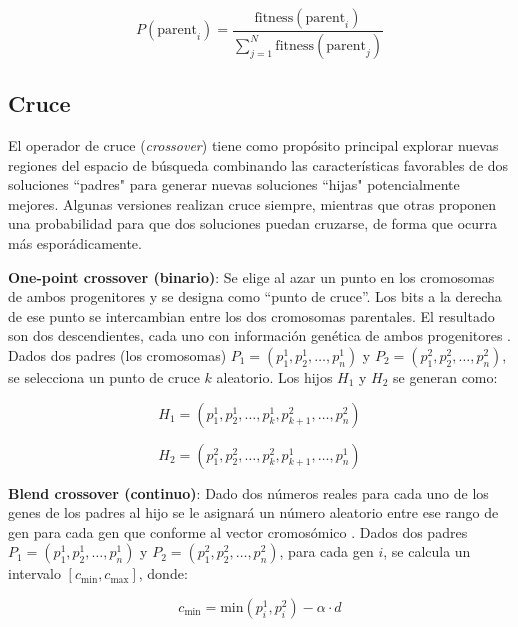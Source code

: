 \documentclass[12pt,letterpaper]{article}
\begin{document}
\begin{equation}
    P(\text{parent}_i) = \frac{\text{fitness}(\text{parent}_i)}{\sum_{j=1}^N \text{fitness}(\text{parent}_j)}
    \label{eq:tournament}
\end{equation}

\subsection{Cruce}
El operador de cruce (\textit{crossover}) tiene como propósito principal explorar nuevas regiones del espacio de búsqueda combinando las características favorables de dos soluciones ``padres" para generar nuevas soluciones ``hijas" potencialmente mejores. Algunas versiones realizan cruce siempre, mientras que otras proponen una probabilidad para que dos soluciones puedan cruzarse, de forma que ocurra más esporádicamente.

\textbf{One-point crossover (binario)}: Se elige al azar un punto en los cromosomas de
ambos progenitores y se designa como ``punto de cruce”. Los bits a la
derecha de ese punto se intercambian entre los dos cromosomas parentales.
El resultado son dos descendientes, cada uno con información genética de
ambos progenitores \cite{DAGDIA2020283}.
Dados dos padres (los cromosomas) \( P_1 = (p_1^1, p_2^1, \dots, p_n^1) \) y \( P_2 = (p_1^2, p_2^2, \dots, p_n^2) \), se selecciona un punto de cruce \( k \) aleatorio. Los hijos \( H_1 \) y \( H_2 \) se generan como:

\begin{equation}
    H_1 = (p_1^1, p_2^1, \dots, p_k^1, p_{k+1}^2, \dots, p_n^2)
    \label{eq:one_point_h1}
\end{equation}

\begin{equation}
    H_2 = (p_1^2, p_2^2, \dots, p_k^2, p_{k+1}^1, \dots, p_n^1)
    \label{eq:one_point_h2}
\end{equation}

\textbf{Blend crossover (continuo)}: Dado dos números reales para cada uno de los genes de
los padres al hijo se le asignará un número aleatorio entre ese rango de gen
para cada gen que conforme al vector cromosómico \cite{purduelecture}.
Dados dos padres \( P_1 = (p_1^1, p_2^1, \dots, p_n^1) \) y \( P_2 = (p_1^2, p_2^2, \dots, p_n^2) \), para cada gen \( i \), se calcula un intervalo \( [c_{\text{min}}, c_{\text{max}}] \), donde:

\begin{equation}
    c_{\text{min}} = \text{min}(p_i^1, p_i^2) - \alpha \cdot d
    \label{eq:blx_cmin}
\end{equation}
\end{document}
